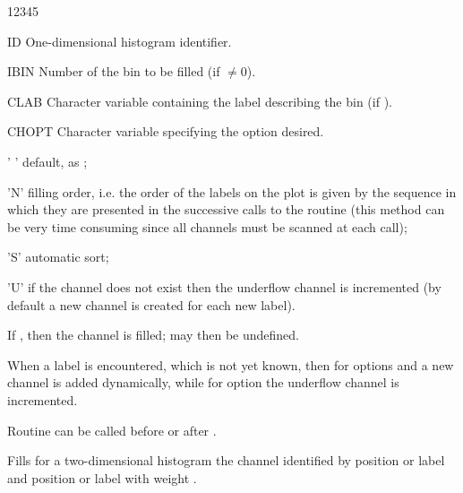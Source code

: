\begin{DLttc}{12345}
\item[ID]     One-dimensional histogram identifier.
\item[IBIN]   Number of the bin to be filled (if $\ne0$).
\item[CLAB]   Character variable containing the label 
              describing the bin (if ).
\item[CHOPT]  Character variable specifying the option desired.
              \begin{DLttc}{12}
                \item[' '] default, as ;
                \item['N'] filling order, i.e. the order of the labels on the
                           plot is given by the sequence in which they are
                           presented in the successive calls to the routine
                           (this method can be very time consuming since all
                           channels must be scanned at each call);
                \item['S'] automatic sort;
                \item['U'] if the channel does not exist 
                           then the underflow channel is incremented
                           (by default a new channel is created for each new label).
                \end{DLttc}
\end{DLttc}

\Remarks
\begin{UL}
\item If , then the channel 
      is filled;  may then be undefined.
\item When a label is encountered, which is not yet known, then for options  
      and  a new channel is added dynamically, while for option 
       the underflow channel is incremented.
\item Routine  can be called  before or after .
\end{UL}


\Action Fills for a two-dimensional histogram the channel identified
by position  or label  and
position  or label  with weight .

